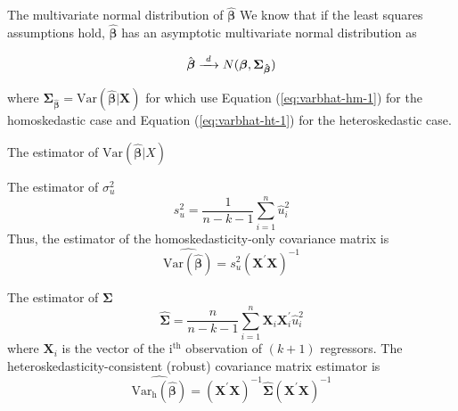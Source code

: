 \documentclass[presentation,10pt]{beamer}
\newcommand{\var}{\mathrm{Var}}
\newcommand{\rarrowd}[1]{\xrightarrow{\text{ \textit #1 }}}
\begin{document}
\begin{frame}[label={sec:orgcfca189}]{The multivariate normal distribution of \(\hat{\mathbf{\beta}}\)}
We know that if the least squares assumptions hold,
\(\hat{\boldsymbol{\beta}}\) has an asymptotic multivariate normal
distribution as

\begin{equation}
\label{eq:normal-bhat-m}
\hat{\boldsymbol{\beta}} \rarrowd{d} N(\boldsymbol{\beta}, \boldsymbol{\Sigma_{\hat{\boldsymbol{\beta}}}})
\end{equation}

where \(\boldsymbol{\Sigma_{\hat{\boldsymbol{\beta}}}} =
\var(\hat{\boldsymbol{\beta}} | \mathbf{X})\) for which use
Equation (\ref{eq:varbhat-hm-1}) for the homoskedastic case and Equation
(\ref{eq:varbhat-ht-1}) for the heteroskedastic case.
\end{frame}

\begin{frame}[label={sec:orgc34546c}]{The estimator of \(\var(\hat{\boldsymbol{\beta}}|X)\)}
\begin{block}{The estimator of \(\sigma^2_u\)}
\begin{equation}
\label{eq:sigma2u}
s^2_u = \frac{1}{n-k-1} \sum_{i=1}^n \hat{u}^2_i
\end{equation}
Thus, the estimator of the homoskedasticity-only covariance matrix
is
\begin{equation}
\label{eq:hat-vbhat-hm}
\widehat{\var(\hat{\boldsymbol{\beta}})} = s^2_u (\mathbf{X}^{\prime} \mathbf{X})^{-1}
\end{equation}
\end{block}

\begin{block}{The estimator of \(\boldsymbol{\Sigma}\)}
\begin{equation}
\label{eq:Sigmahat}
\widehat{\boldsymbol{\Sigma}} = \frac{n}{n-k-1} \sum_{i=1}^n
\mathbf{X}_i \mathbf{X}_i^{\prime} \hat{u}^2_i
\end{equation}
where \(\mathbf{X}_i\) is the vector of the i\(^{\text{th}}\)
observation of \((k+1)\) regressors.
The \alert{heteroskedasticity-consistent (robust) covariance matrix estimator} is
\begin{equation}
\label{eq:hat-vbhat-ht}
\widehat{\var_{\mathrm{h}}(\hat{\boldsymbol{\beta}})} = \left(\mathbf{X}^{\prime} \mathbf{X}\right)^{-1} \widehat{\boldsymbol{\Sigma}} (\mathbf{X}^{\prime} \mathbf{X})^{-1}
\end{equation}
\end{block}
\end{frame}
\end{document}
